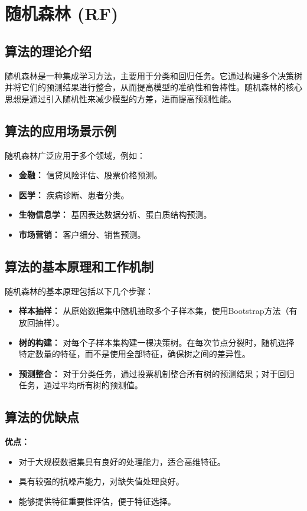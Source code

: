 \section{随机森林 (RF)}
\subsection*{算法的理论介绍}
随机森林是一种集成学习方法，主要用于分类和回归任务。它通过构建多个决策树并将它们的预测结果进行整合，从而提高模型的准确性和鲁棒性。随机森林的核心思想是通过引入随机性来减少模型的方差，进而提高预测性能。

\subsection*{算法的应用场景示例}
随机森林广泛应用于多个领域，例如：
\begin{itemize}
    \item \textbf{金融：} 信贷风险评估、股票价格预测。
    \item \textbf{医学：} 疾病诊断、患者分类。
    \item \textbf{生物信息学：} 基因表达数据分析、蛋白质结构预测。
    \item \textbf{市场营销：} 客户细分、销售预测。
\end{itemize}

\subsection*{算法的基本原理和工作机制}
随机森林的基本原理包括以下几个步骤：
\begin{itemize}
    \item \textbf{样本抽样：} 从原始数据集中随机抽取多个子样本集，使用Bootstrap方法（有放回抽样）。
    \item \textbf{树的构建：} 对每个子样本集构建一棵决策树。在每次节点分裂时，随机选择特定数量的特征，而不是使用全部特征，确保树之间的差异性。
    \item \textbf{预测整合：} 对于分类任务，通过投票机制整合所有树的预测结果；对于回归任务，通过平均所有树的预测值。
\end{itemize}

\subsection*{算法的优缺点}
\textbf{优点：}
\begin{itemize}
    \item 对于大规模数据集具有良好的处理能力，适合高维特征。
    \item 具有较强的抗噪声能力，对缺失值处理良好。
    \item 能够提供特征重要性评估，便于特征选择。
\end{itemize}

